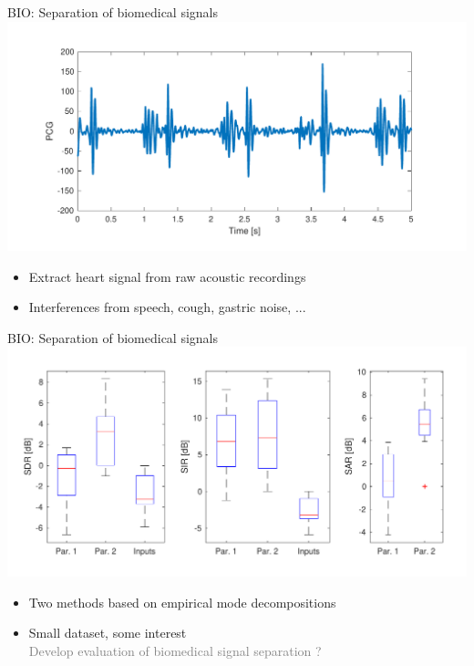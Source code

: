 \documentclass{beamer}
\begin{document}
\begin{frame}{BIO: Separation of biomedical signals}
\includegraphics[width=\textwidth]{fig/BIO-PCG.pdf}
\begin{itemize}
\item Extract heart signal from raw acoustic recordings
\item Interferences from speech, cough, gastric noise, ...
\end{itemize}
\end{frame}

\begin{frame}{BIO: Separation of biomedical signals}
\includegraphics[width=\textwidth]{fig/BIO-results.pdf}
\begin{itemize}
\item Two methods based on empirical mode decompositions
\item Small dataset, some interest\\\textcolor{gray}{Develop evaluation of biomedical signal separation ?}
\end{itemize}

\end{frame}
\end{document}
